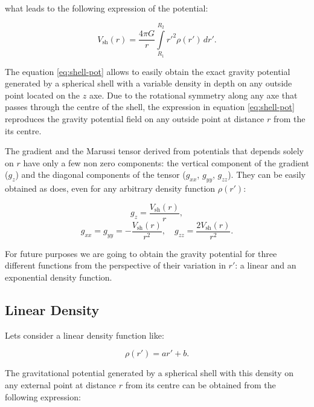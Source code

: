 \documentclass[extra]{gji}
\begin{document}
\noindent what leads to the following expression of the potential:

\begin{equation}
    V_\text{sh}(r) = \frac{4\pi G}{r}
    \int\limits_{R_1}^{R_2} {r'}^2 \rho(r') \, dr'.
\label{eq:shell-pot}
\end{equation}

The equation \ref{eq:shell-pot} allows to easily obtain the exact 
gravity potential generated by a spherical shell with a variable 
density in depth on any outside point located on the $z$ axe.
Due to the rotational symmetry along any axe that passes through the 
centre of the shell, the expression in equation \ref{eq:shell-pot} 
reproduces the gravity potential field on any outside point at distance 
$r$ from the its centre.

The gradient and the Marussi tensor derived from potentials that 
depends solely on $r$ have only a few non zero components: the vertical 
component of the gradient ($g_z$) and the diagonal components of the 
tensor ($g_{xx}$, $g_{yy}$, $g_{zz}$).
They can be easily obtained as \citet{Grombein2013} does, even for any 
arbitrary density function $\rho(r')$:

\begin{equation}
    g_z = \frac{V_\text{sh}(r)}{r},
\end{equation}
\begin{equation}
    g_{xx} = g_{yy} = -\frac{V_\text{sh}(r)}{r^2}, \quad
    g_{zz} = \frac{2V_\text{sh}(r)}{r^2}.
\end{equation}

For future purposes we are going to obtain the gravity potential for 
three different functions from the perspective of their variation in 
$r'$: a linear and an exponential density function.


\subsection{Linear Density}

Lets consider a linear density function like:

\begin{equation}
    \rho(r') = ar' + b.
\end{equation}

\noindent The gravitational potential generated by a spherical shell 
with this density on any external point at distance $r$ from its centre 
can be obtained from the following expression:
\end{document}
